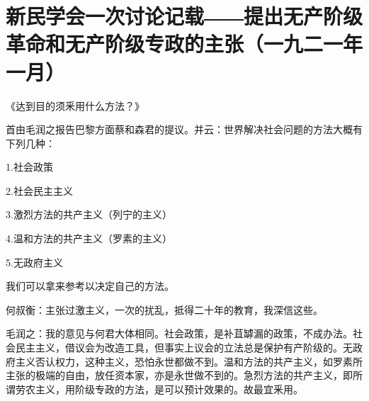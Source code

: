 \section{新民学会一次讨论记载――提出无产阶级革命和无产阶级专政的主张（一九二一年一月）}


《达到目的须釆用什么方法？》

首由毛润之报告巴黎方面蔡和森君的提议。并云：世界解决社会问题的方法大概有下列几种：

1.社会政策

2.社会民主主义

3.激烈方法的共产主义（列宁的主义）

4.温和方法的共产主义（罗素的主义）

5.无政府主义

我们可以拿来参考以决定自己的方法。

何叔衡：主张过激主义，一次的扰乱，抵得二十年的教育，我深信这些。

毛润之：我的意见与何君大体相同。社会政策，是补苴罅漏的政策，不成办法。社会民主主义，借议会为改造工具，但事实上议会的立法总是保护有产阶级的。无政府主义否认权力，这种主义，恐怕永世都做不到。温和方法的共产主义，如罗素所主张的极端的自由，放任资本家，亦是永世做不到的。急烈方法的共产主义，即所谓劳农主义，用阶级专政的方法，是可以预计效果的。故最宜釆用。

